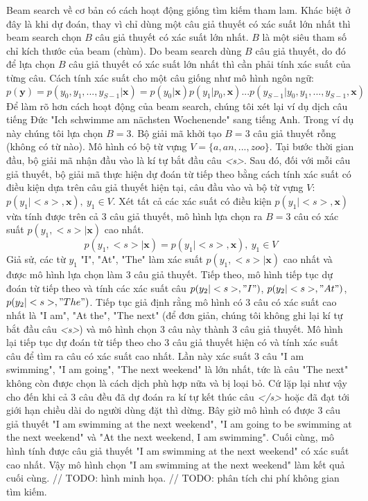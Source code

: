 Beam search về cơ bản có cách hoạt động giống tìm kiếm tham lam. Khác biệt ở đây là khi dự đoán, thay vì chỉ dùng một câu giả thuyết có xác suất lớn nhất thì beam search chọn $B$ câu giả thuyết có xác suất lớn nhất. $B$ là một siêu tham số chỉ kích thước của beam (chùm). Do beam search dùng $B$ câu giả thuyết, do đó để lựa chọn $B$ câu giả thuyết có xác suất lớn nhất thì cần phải tính xác suất của từng câu. Cách tính xác suất cho một câu giống như mô hình ngôn ngữ:
\begin{equation}
p(\bm{y}) = p(y_0, y_1, ..., y_{S-1} | \bm{x}) = p(y_0 | \bm{x}) p(y_1 | p_0, \bm{x})...p(y_{S-1} | y_0, y_1, ...,y_{S-1}, \bm{x})
\end{equation}
Để làm rõ hơn cách hoạt động của beam search, chúng tôi xét lại ví dụ dịch câu tiếng Đức "Ich schwimme am nächsten Wochenende" sang tiếng Anh. Trong ví dụ này chúng tôi lựa chọn $B = 3$. Bộ giải mã khởi tạo $B = 3$ câu giả thuyết rỗng (không có từ nào). Mô hình có bộ từ vựng $V = \{a,an,...,zoo\}$. Tại bước thời gian đầu, bộ giải mã nhận đầu vào là kí tự bắt đầu câu \textit{<s>}. Sau đó, đối với mỗi câu giả thuyết, bộ giải mã thực hiện dự đoán từ tiếp theo bằng cách tính xác suất có điều kiện dựa trên câu giả thuyết hiện tại, câu đầu vào và bộ từ vựng $V$: $p(y_1 | <s>, \bm{x}), \ y_1 \in V$. Xét tất cả các xác suất có điều kiện $p(y_1 | <s>, \bm{x})$ vừa tính được trên cả 3 câu giả thuyết, mô hình lựa chọn ra $B = 3$ câu có xác suất $p(y_1, <s> | \bm{x})$ cao nhất.
\begin{equation*}
p(y_1, <s> | \bm{x}) = p(y_1 | <s>, \bm{x}),\ y_1 \in V
\end{equation*}
Giả sử, các từ $y_1$ "I", "At", "The" làm xác suất $p(y_1, <s> | \bm{x})$ cao nhất và được mô hình lựa chọn làm 3 câu giả thuyết. Tiếp theo, mô hình tiếp tục dự đoán từ tiếp theo và tính các xác suất câu $p(y_2 | <s>, "I")$, $p(y_2 | <s>, "At")$, $p(y_2 | <s>, "The")$. Tiếp tục giả định rằng mô hình có 3 câu có xác suất cao nhất là "I am", "At the", "The next" (để đơn giản, chúng tôi không ghi lại kí tự bắt đầu câu \textit{<s>}) và mô hình chọn 3 câu này thành 3 câu giả thuyết. Mô hình lại tiếp tục dự đoán từ tiếp theo cho 3 câu giả thuyết hiện có và tính xác suất câu để tìm ra câu có xác suất cao nhất. Lần này xác suất 3 câu "I am swimming", "I am going", "The next weekend" là lớn nhất, tức là câu "The next" không còn được chọn là cách dịch phù hợp nữa và bị loại bỏ. Cứ lặp lại như vậy cho đến khi cả 3 câu đều đã dự đoán ra kí tự kết thúc câu \textit{</s>} hoặc đã đạt tới giới hạn chiều dài do người dùng đặt thì dừng. Bây giờ mô hình có được 3 câu giả thuyết "I am swimming at the next weekend", "I am going to be swimming at the next weekend" và "At the next weekend, I am swimming". Cuối cùng, mô hình tính được câu giả thuyết "I am swimming at the next weekend" có xác suất cao nhất. Vậy mô hình chọn "I am swimming at the next weekend" làm kết quả cuối cùng.
// TODO: hình minh họa.
// TODO: phân tích chi phí không gian tìm kiếm.

